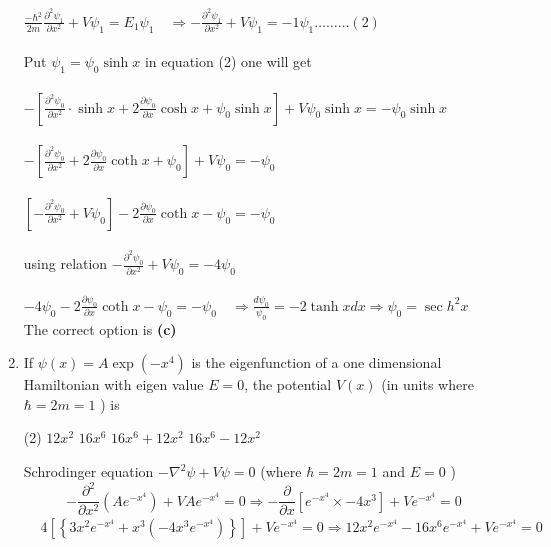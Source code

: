 \begin{enumerate}
\begin{answer}
	$\frac{-\hbar^{2}}{2 m} \frac{\partial^{2} \psi_{1}}{\partial x^{2}}+V \psi_{1}=E_{1} \psi_{1} \quad \Rightarrow-\frac{\partial^{2} \psi_{1}}{\partial x^{2}}+V \psi_{1}=-1 \psi_{1} \ldots \ldots \ldots(2)$\\\\
	Put $\psi_{1}=\psi_{0} \sinh x$ in equation (2) one will get\\\\
	$-\left[\frac{\partial^{2} \psi_{0}}{\partial x^{2}} \cdot \sinh x+2 \frac{\partial \psi_{0}}{\partial x} \cosh x+\psi_{0} \sinh x\right]+V \psi_{0} \sinh x=-\psi_{0} \sinh x$\\\\
	$-\left[\frac{\partial^{2} \psi_{0}}{\partial x^{2}}+2 \frac{\partial \psi_{0}}{\partial x} \operatorname{coth} x+\psi_{0}\right]+V \psi_{0}=-\psi_{0}$\\\\
	$\left[-\frac{\partial^{2} \psi_{0}}{\partial x^{2}}+V \psi_{0}\right]-2 \frac{\partial \psi_{0}}{\partial x} \operatorname{coth} x-\psi_{0}=-\psi_{0}$\\\\
	 using relation $-\frac{\partial^{2} \psi_{0}}{\partial x^{2}}+V \psi_{0}=-4 \psi_{0}$\\\\
	$-4 \psi_{0}-2 \frac{\partial \psi_{0}}{\partial x} \operatorname{coth} x-\psi_{0}=-\psi_{0} \quad \Rightarrow \frac{d \psi_{0}}{\psi_{0}}=-2 \tanh x d x \Rightarrow \psi_{0}=\sec h^{2} x$\\
	The correct option is \textbf{(c)}
\end{answer}
	\item If $\psi(x)=A \exp \left(-x^{4}\right)$ is the eigenfunction of a one dimensional Hamiltonian with eigen value $E=0$, the potential $V(x)$ (in units where $\hbar=2 m=1$ ) is
	{}
\begin{tasks}(2)
	\task[\textbf{A.}] $12 x^{2}$
	\task[\textbf{B.}]$16 x^{6}$
	\task[\textbf{C.}]$16 x^{6}+12 x^{2}$
	\task[\textbf{D.}]$16 x^{6}-12 x^{2}$
\end{tasks}
\begin{answer}
	 Schrodinger equation
	$-\nabla^{2} \psi+V \psi=0$ (where $\hbar=2 m=1$ and $E=0$ )
	$$
	-\frac{\partial^{2}}{\partial x^{2}}\left(A e^{-x^{4}}\right)+V A e^{-x^{4}}=0 \Rightarrow-\frac{\partial}{\partial x}\left[e^{-x^{4}} \times-4 x^{3}\right]+V e^{-x^{4}}=0
	$$
	\begin{align*}
		&4\left[\left\{3 x^{2} e^{-x^{4}}+x^{3}\left(-4 x^{3} e^{-x^{4}}\right)\right\}\right]+V e^{-x^{4}}=0 \Rightarrow 12 x^{2} e^{-x^{4}}-16 x^{6} e^{-x^{4}}+V e^{-x^{4}}=0 \\

\end{align*}
\end{answer}
\end{enumerate}
